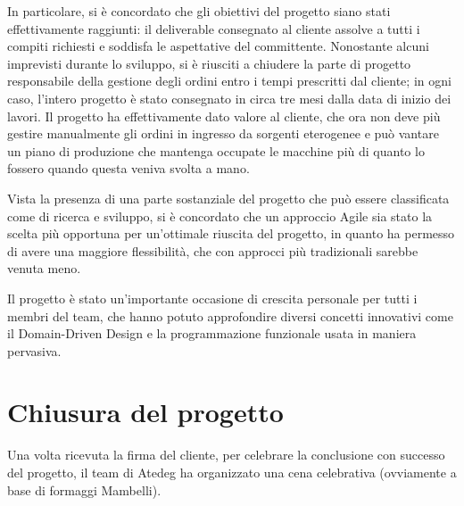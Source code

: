 In particolare, si è concordato che gli obiettivi del progetto siano stati effettivamente raggiunti: il deliverable consegnato al cliente assolve a tutti i compiti richiesti e soddisfa le aspettative del committente.
Nonostante alcuni imprevisti durante lo sviluppo, si è riusciti a chiudere la parte di progetto responsabile della gestione degli ordini entro i tempi prescritti dal cliente; in ogni caso, l'intero progetto è stato consegnato in circa tre mesi dalla data di inizio dei lavori.
Il progetto ha effettivamente dato valore al cliente, che ora non deve più gestire manualmente gli ordini in ingresso da sorgenti eterogenee e può vantare un piano di produzione che mantenga occupate le macchine più di quanto lo fossero quando questa veniva svolta a mano.

Vista la presenza di una parte sostanziale del progetto che può essere classificata come di ricerca e sviluppo, si è concordato che un approccio Agile sia stato la scelta più opportuna per un'ottimale riuscita del progetto, in quanto ha permesso di avere una maggiore flessibilità, che con approcci più tradizionali sarebbe venuta meno.

Il progetto è stato un'importante occasione di crescita personale per tutti i membri del team, che hanno potuto approfondire diversi concetti innovativi come il Domain-Driven Design e la programmazione funzionale usata in maniera pervasiva.

\section{Chiusura del progetto}
Una volta ricevuta la firma del cliente, per celebrare la conclusione con successo del progetto, il team di Atedeg ha organizzato una cena celebrativa (ovviamente a base di formaggi Mambelli).

